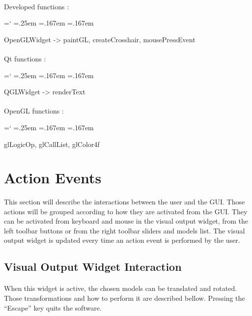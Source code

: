 \documentclass[12pt]{report}
\DeclareRobustCommand*{\ttfamily}{
  \origttfamily
  \hyphenchar\font=`\-\relax
  \fontdimen3\font=.25em\relax
  \fontdimen4\font=.167em\relax
  \fontdimen7\font=.167em\relax
}
\newenvironment{code}{\ttfamily}{}
\begin{document}
\paragraph{}
	Developed functions :

	\begin{code}
	OpenGLWidget -> paintGL, createCrosshair, mousePressEvent
	\end{code}

\paragraph{}
	Qt functions :

	\begin{code}
	QGLWidget -> renderText
	\end{code}

\paragraph{}
	OpenGL functions :

	\begin{code}
	glLogicOp, glCallList, glColor4f
	\end{code}




\section{Action Events} \label{sec:action events}
\paragraph{}
	This section will describe the interactions between the user and the GUI. Those actions will be grouped according to how they are activated from the GUI. They can be activated from keyboard and mouse in the visual output widget, from the left toolbar buttons or from the right toolbar sliders and models list. The visual output widget is updated every time an action event is performed by the user.



\subsection{Visual Output Widget Interaction} \label{subsec:visual output widget}
\paragraph{}
	When this widget is active, the chosen models can be translated and rotated. Those transformations and how to perform it are described bellow.
Pressing the ``Escape'' key quits the software.
\end{document}
